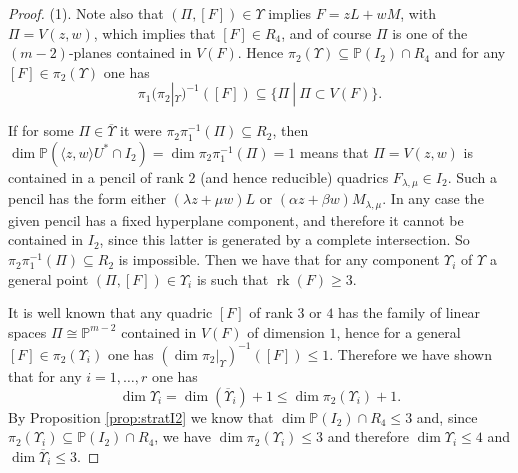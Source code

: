 \documentclass[10pt, a4paper]{amsart}
\theoremstyle{plain}
\theoremstyle{definition}
\theoremstyle{remark}
\def\PP{\mathbb{P}}
\begin{document}
\begin{proof} {(1).}
 Note also that  $(\Pi,[F])\in\varUpsilon$ implies $F=zL+wM$, with $\Pi=V(z,w)$, which implies that $[F]\in R_4$, and of course $\Pi$ is one of the $(m-2)$-planes contained in $V(F)$. Hence $\pi_2(\varUpsilon)\subseteq \PP(I_2)\cap R_4$ and for any $[F]\in \pi_2(\varUpsilon)$ one has $$\pi_1(\pi_2|_{\varUpsilon})^{-1}([F])\subseteq \{\Pi\ |\ \Pi\subset V(F)\}.$$

 If for some $\Pi\in\overline{\varUpsilon}$ it were $\pi_2\pi_1^{-1}(\Pi) \subseteq R_2$, then $\dim\PP(\langle z,w\rangle U^\ast\cap I_2)=\dim\pi_2\pi_1^{-1}(\Pi)=1$ means that $\Pi=V(z,w)$ is  contained in a pencil of rank $2$ (and hence reducible) quadrics  $F_{\lambda,\mu}\in I_2$. Such a pencil has the form either $(\lambda z+\mu w)L$ or $(\alpha z+\beta w)M_{\lambda,\mu}$. In any case the given pencil has a fixed hyperplane component, and therefore it cannot be contained in $I_2$, since this latter is generated by a complete intersection. So $\pi_2\pi_1^{-1}(\Pi) \subseteq R_2$ is impossible. Then we have that
 for any component $\varUpsilon_i$ of $\varUpsilon$ a general point $(\Pi,[F])\in\varUpsilon_i$ is such that $\operatorname{rk}(F)\geq 3$.
 \vskip2mm
 
 It is well known that any quadric $[F]$ of rank  $3$ or $4$ has the family of linear spaces $\Pi\cong\PP^{m-2}$ contained in $V(F)$ of  dimension $1$, hence for a general $[F]\in\pi_2(\varUpsilon_i)$ one has $(\dim\pi_2|_\varUpsilon)^{-1}([F])\leq 1$. Therefore we have shown that for any $i=1,\ldots,r$ one has
 \begin{equation}\label{eq:dimUpsiloni}\dim\varUpsilon_i=\dim(\overline\varUpsilon_i)+1\leq \dim\pi_2(\varUpsilon_i)+1.\end{equation}
By Proposition \ref{prop:stratI2} we know that  $\dim \PP(I_2)\cap R_4\leq 3$ and, since $\pi_2(\varUpsilon_i)\subseteq \PP(I_2)\cap R_4$, we have  $\dim\pi_2(\varUpsilon_i)\leq 3$ and therefore $\dim\varUpsilon_i\leq 4$ and $\dim\overline{\varUpsilon}_i\leq 3$. 
 
\end{proof}
\end{document}
